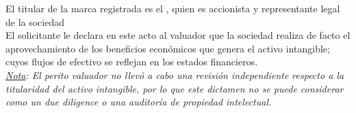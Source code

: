 El titular de la marca registrada \textcolor{principal}{\marca{}} es el \textcolor{principal}{\personaSolicitante}, quien es accionista y representante legal de la sociedad \textcolor{principal}{\empresaSolicitante}\\

El solicitante le declara en este acto al valuador que la sociedad 
\textcolor{principal}{\empresaSolicitante} realiza de facto el aprovechamiento de los beneficios econ\'omicos que genera el activo intangible; cuyos flujos de efectivo se reflejan en los estados financieros.\\

\textit{\underline{Nota}: El perito valuador no llev\'o a cabo una revisi\'on independiente respecto a la titularidad del activo intangible, por lo que este dictamen no se puede considerar como un due diligence o una auditor\'ia de propiedad intelectual.}